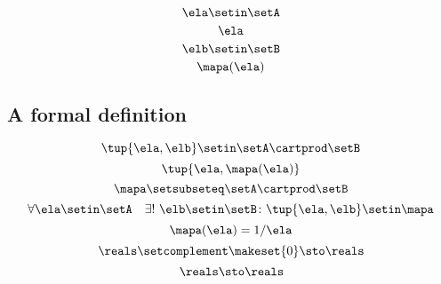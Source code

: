 {\begin{forslides}
        \begin{equation}
            \label{eq:slides_session2_103}
            \ela \setin\setA
        \end{equation}
        \begin{equation}
            \label{eq:slides_session2_104}
            \ela
        \end{equation}
        \begin{equation}
            \label{eq:slides_session2_105}
            \elb \setin \setB
        \end{equation}
        \begin{equation}
            \label{eq:slides_session2_106}
            \mapa(\ela)
        \end{equation}

        \subsection{A formal definition}

        \begin{equation}
            \label{eq:slides_session2_107}
            \tup{\ela, \elb} \setin\setA \cartprod \setB
        \end{equation}
        \begin{equation}
            \label{eq:slides_session2_108}
            \tup{\ela, \mapa(\ela)}
        \end{equation}
        \begin{equation}
            \label{eq:slides_session2_109}
            \mapa \setsubseteq \setA \cartprod \setB
        \end{equation}
        \begin{equation}
            \label{eq:slides_session2_110}
            \forall \ela \setin\setA  \quad  \exists !
            \ \elb \setin\setB \colon \tup{\ela,\elb} \setin\mapa
        \end{equation}
        \begin{equation}
            \label{eq:slides_session2_111}
            \mapa(\ela) = 1/ \ela
        \end{equation}
        \begin{equation}
            \label{eq:slides_session2_112}
            \reals \setcomplement \makeset{ 0 } \sto \reals
        \end{equation}
        \begin{equation}
            \label{eq:slides_session2_113}
            \reals \sto \reals
        \end{equation}


\end{forslides}}
